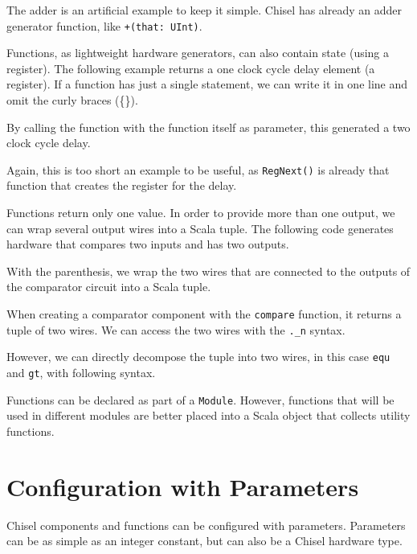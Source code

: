 \documentclass[%
    10pt,
    headinclude, footexclude,
    openright, %
    notitlepage,
    cleardoubleempty,
    headsepline,
    pointlessnumbers,
    bibtotoc, idxtotoc,
    ]{scrbook}
\newcommand{\code}[1]{{\small{\texttt{#1}}}}
\begin{document}
The adder is an artificial example
to keep it simple. Chisel has already an adder generator function, like \code{+(that: UInt)}.

Functions, as lightweight hardware generators, can also contain state (using a register).
The following example returns a one clock cycle delay element (a register).
If a function has just a single statement, we can write it in one line and omit the curly
braces (\{\}).


\noindent By calling the function with the function itself as parameter, this generated a two
clock cycle delay.


\noindent Again, this is too short an example to be useful, as \code{RegNext()}
is already that function that creates the register for the delay.



Functions return only one value. In order to provide more than one output, we
can wrap several output wires into a Scala tuple. The following code generates hardware that
compares two inputs and has two outputs.


\noindent With the parenthesis, we wrap the two wires that are connected to the outputs of
the comparator circuit into a Scala tuple.

When creating a comparator component
with the \code{compare} function, it returns a tuple of two wires. We can access the two
wires with the \code{.\_n} syntax.


\noindent However, we can directly decompose the tuple into two wires, in this case \code{equ}
and \code{gt}, with following syntax.



Functions can be declared as part of a \code{Module}. However, functions that will be
used in different modules are better placed into a Scala object that collects utility
functions.


\section{Configuration with Parameters}

Chisel components and functions can be configured with parameters.
Parameters can be as simple as an integer constant, but can also be a Chisel
hardware type.
\end{document}
